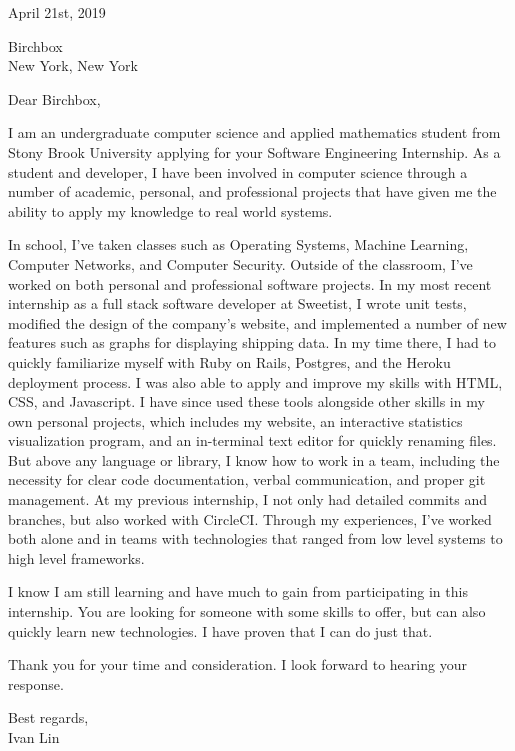 \documentclass[12pt]{deedy-resume-openfont}
\begin{document}
%
%
\sectionsep

\selectfont
\raggedright

April 21st, 2019\\
\sectionsep


Birchbox\\
New York, New York\\
\sectionsep

Dear Birchbox,\\
\sectionsep

I am an undergraduate computer science and applied mathematics student from Stony Brook University applying for your Software Engineering Internship. As a student and developer, I have been involved in computer science through a number of academic, personal, and professional projects that have given me the ability to apply my knowledge to real world systems.\\
\sectionsep

In school, I’ve taken classes such as Operating Systems, Machine Learning, Computer Networks, and Computer Security. Outside of the classroom, I’ve worked on both personal and professional software projects. In my most recent internship as a full stack software developer at Sweetist, I wrote unit tests, modified the design of the company’s website, and implemented a number of new features such as graphs for displaying shipping data. In my time there, I had to quickly familiarize myself with Ruby on Rails, Postgres, and the Heroku deployment process. I was also able to apply and improve my skills with HTML, CSS, and Javascript. I have since used these tools alongside other skills in my own personal projects, which includes my website, an interactive statistics visualization program, and an in-terminal text editor for quickly renaming files. But above any language or library, I know how to work in a team, including the necessity for clear code documentation, verbal communication, and proper git management. At my previous internship, I not only had detailed commits and branches, but also worked with CircleCI. Through my experiences, I’ve worked both alone and in teams with technologies that ranged from low level systems to high level frameworks.\\
\sectionsep

I know I am still learning and have much to gain from participating in this internship. You are looking for someone with some skills to offer, but can also quickly learn new technologies. I have proven that I can do just that.\\
\sectionsep

Thank you for your time and consideration. I look forward to hearing your response.\\
\sectionsep

Best regards,\\
Ivan Lin
\end{document}
